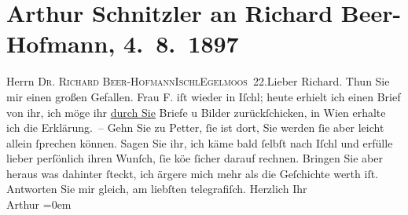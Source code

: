 

         
         \renewcommand{\erwaehntePersonen}{Personen: Richard Beer-Hofmann, Rosa Freudenthal}
         \renewcommand{\erwaehnteOrte}{Orte: Bad Ischl, Eglmoosgasse, Hotel und Pension Rudolfshöhe (Leopold Petter), IX., Alsergrund, Wien}
         \renewcommand{\erwaehnteWerke}{}
               \section[Arthur Schnitzler an Richard Beer-Hofmann, 4. 8. 1897]{ Arthur Schnitzler an Richard Beer-Hofmann, 4. 8. 1897}\nopagebreak{}\rehead{ }\begin{ledgroupsized}[t]{13cm}\normalsize\beginnumbering \toendnotes[C]{\smallbreak\pagebreak[2]} 
\toendnotes[C]{\smallbreak}\pstart{}{\pb}Herrn \textsc{Dr. Richard
                     Beer-Hofmann}\pend{}\pstart{}\textsc{Ischl}\pend{}\pstart{}\textsc{Egelmoos 22}.\pend{}{\bigskip}\pstart{}{\pb}Lieber Richard.\pend\pstart
           Thun Sie mir einen großen Gefallen.\pend
           \pstart
           Frau F. iſt wieder in Iſchl; heute erhielt ich einen Brief von ihr, ich möge ihr \uline{durch Sie} Briefe u Bilder zurückſchicken, in Wien erhalte ich die Erklärung. – Gehn Sie zu {\pb}Petter, ſie ist \label{K_L00712-1v}\label{K_L00712-1h} dort, Sie werden ſie aber leicht allein ſprechen können. Sagen Sie
               ihr, ich käme bald ſelbſt nach Iſchl und erfülle
               lieber perſönlich ihren Wunſch, ſie kö{\geminationn}e ſicher darauf
               rechnen. {\pb}Bringen Sie aber heraus was dahinter ſteckt,
               ich ärgere mich mehr als die Geſchichte werth iſt. Antworten Sie mir gleich, am
               liebſten telegrafiſch.\pend
           \pstart
           Herzlich Ihr{\\[\baselineskip]}\spacefill\mbox{Arthur}\pend
           \leftskip=0em{}
         
         \endnumbering{}\end{ledgroupsized}  \newcommand{\dateiname}{L00712}\newcommand{\titel}{Arthur Schnitzler an Richard Beer-Hofmann, 4. 8. 1897}\newcommand{\editorInnen}{Martin Anton Müller und Gerd-Hermann Susen}
      